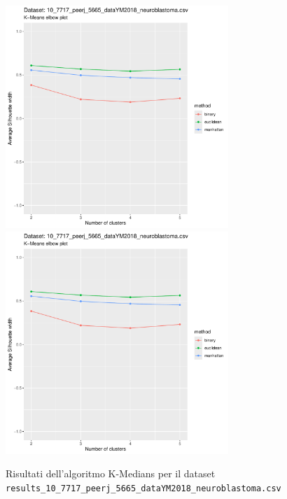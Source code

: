 \documentclass[12pt]{report}
\begin{document}
			\begin{figure}[h]
				\centering
				\includegraphics[width = 0.75\textwidth, height = 0.45\textheight, page = 3]{
					results/results_10_7717_peerj_5665_dataYM2018_neuroblastoma.csv.pdf
				}
				\includegraphics[width = 0.75\textwidth, height = 0.45\textheight, page = 4]{
					results/results_10_7717_peerj_5665_dataYM2018_neuroblastoma.csv.pdf
				}
				\caption{Risultati dell'algoritmo K-Medians per il dataset
				\texttt{results\_10\_7717\_peerj\_5665\_dataYM2018\_neuroblastoma.csv}}
				\label{fig:kmedians3}
			\end{figure}
\end{document}
